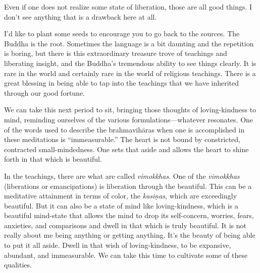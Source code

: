 Even if one does not realize some state of liberation, those are all
good things. I don’t see anything that is a drawback here at all.

I’d like to plant some seeds to encourage you to go back to the sources.
The Buddha is the root. Sometimes the language is a bit daunting and the
repetition is boring, but there is this extraordinary treasure trove of
teachings and liberating insight, and the Buddha’s tremendous ability to
see things clearly. It is rare in the world and certainly rare in the
world of religious teachings. There is a great blessing in being able to
tap into the teachings that we have inherited through our good fortune.

We can take this next period to sit, bringing those thoughts of
loving-kindness to mind, reminding ourselves of the various
formulations—whatever resonates. One of the words used to describe the
brahmavihāras when one is accomplished in these meditations is
“immeasurable.” The heart is not bound by constricted, contracted
small-mindedness. One sets that aside and allows the heart to shine
forth in that which is beautiful.

In the teachings, there are what are called \emph{vimokkhas}. One of the
\emph{vimokkhas} (liberations or emancipations) is liberation through
the beautiful. This can be a meditative attainment in terms of color,
the \emph{kasiṇas}, which are exceedingly beautiful. But it can also be
a state of mind like loving-kindness, which is a beautiful mind-state
that allows the mind to drop its self-concern, worries, fears,
anxieties, and comparisons and dwell in that which is truly beautiful.
It is not really about me being anything or getting anything. It’s the
beauty of being able to put it all aside. Dwell in that wish of
loving-kindness, to be expansive, abundant, and immeasurable. We can
take this time to cultivate some of these qualities.
